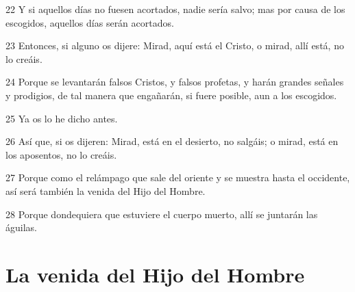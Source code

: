 \par 22 Y si aquellos días no fuesen acortados, nadie sería salvo; mas por causa de los escogidos, aquellos días serán acortados.
\par 23 Entonces, si alguno os dijere: Mirad, aquí está el Cristo, o mirad, allí está, no lo creáis.
\par 24 Porque se levantarán falsos Cristos, y falsos profetas, y harán grandes señales y prodigios, de tal manera que engañarán, si fuere posible, aun a los escogidos.
\par 25 Ya os lo he dicho antes.
\par 26 Así que, si os dijeren: Mirad, está en el desierto, no salgáis; o mirad, está en los aposentos, no lo creáis.
\par 27 Porque como el relámpago que sale del oriente y se muestra hasta el occidente, así será también la venida del Hijo del Hombre.
\par 28 Porque dondequiera que estuviere el cuerpo muerto, allí se juntarán las águilas.

\section*{La venida del Hijo del Hombre}


